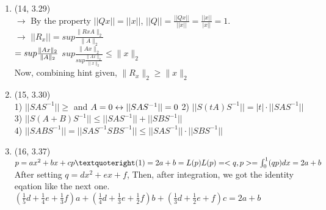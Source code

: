 \documentclass[letterpaper,12pt]{article}
\theoremstyle{definition}
\begin{document}
\begin{enumerate}
	(ii)  $\frac{1}{\sqrt{n}} \| A \|_{\infty} \leq \| A \|_{2} $\\
$sup \frac{\| AX \|_{\infty}}{\sqrt{n}\| X \|_{\infty} }  \leq sup \frac{\| AX \|_{2}}{\| X \|_{2} }$\\
$	\| A \|_{2} \leq \sqrt{n} \| A \|_{\infty} $ \\
	$sup \frac{\| AX \|_{2}}{\| X \|_{2} }  \leq sup \frac{\sqrt{n}\| AX \|_{\infty}}{\| X \|_{\infty} }$\\
	Now, same logic above applies.





	\item (14, 3.29) \\
		$\rightarrow$ By the property $||Qx||=||x||$, $||Q|| = \frac{||Qx||}{||x||}=\frac{||x||}{|x||} = 1 $.\\
	       $\rightarrow$ $||R_{x}|| = sup \frac{\| RxA \|_{2}}{\| A \|_{2}} $ \\
	$ =  sup \frac{\| Ax \|_{2}}{\| A \|_{2}}\\$
	 $sup \frac{\| Ax \|_{2}}{ sup \frac{\| Ax \|_{2}}{\| x \|_{2}}} \leq  \| x \|_{2} $\\
Now, combining hint given, $\| R_{x}\|_{2} \geq \| x\|_{2}$




	\item (15, 3.30)  \\
			1) $||SAS^{-1}|| \geq $ and    $A=0 \leftrightarrow ||SAS^{-1}|| = 0\\$
			2) $||S(tA)S^{-1}|| = |t| \cdot ||SAS^{-1}|| $ \\
	 		3) $||S(A+B)S^{-1}|| \leq ||SAS^{-1}|| + ||SBS^{-1}||$ \\
			4) $||SABS^{-1}|| = ||SAS^{-1}SBS^{-1}|| \leq ||SAS^{-1}||\cdot ||SBS^{-1}||$\\



	\item (16, 3.37) \\
		$p = ax^2 +bx + c \\ p’(1) = 2a+b = L(p)\\ L(p) = <q, p> = \int_{0}^{1}(qp)dx = 2a+b$\\
		After setting $q = dx^2 + ex + f$, Then, after integration, we got the identity eqation like the next one.\\
		$(\frac{1}{5}d + \frac{1}{4}e + \frac{1}{3}f)a + (\frac{1}{4}d + \frac{1}{3}e + \frac{1}{2}f)b + (\frac{1}{3}d + \frac{1}{2}e + f)c = 2a+b$\\ \\


\end{enumerate}
\end{document}
